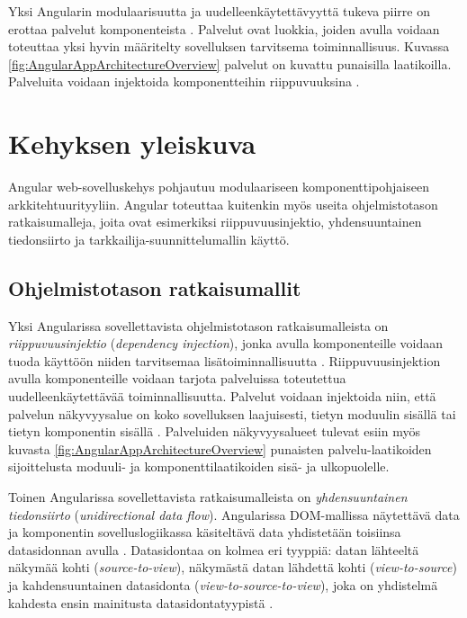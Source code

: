 \documentclass[finnish]{tktltiki2}
\theoremstyle{definition}
\theoremstyle{remark}
\numberwithin{figure}{section}
\begin{document}
Yksi Angularin modulaarisuutta ja uudelleenkäytettävyyttä tukeva piirre on erottaa palvelut komponenteista \cite{ArchitectureServices}. Palvelut ovat luokkia, joiden avulla voidaan toteuttaa yksi hyvin määritelty sovelluksen tarvitsema toiminnallisuus. Kuvassa \ref{fig:AngularAppArchitectureOverview} palvelut on kuvattu punaisilla laatikoilla. Palveluita voidaan injektoida komponentteihin riippuvuuksina \cite{ArchitectureServices}. 

\newpage


\section{Kehyksen yleiskuva}

Angular web-sovelluskehys pohjautuu modulaariseen komponenttipohjaiseen arkkitehtuurityyliin. Angular toteuttaa kuitenkin myös useita ohjelmistotason ratkaisumalleja, joita ovat esimerkiksi riippuvuusinjektio, yhdensuuntainen tiedonsiirto ja tarkkailija-suunnittelumallin käyttö.

\subsection{Ohjelmistotason ratkaisumallit}

Yksi Angularissa sovellettavista ohjelmistotason ratkaisumalleista on \textit{riippuvuusinjektio} (\textit{dependency injection}), jonka avulla komponenteille voidaan tuoda käyttöön niiden tarvitsemaa lisätoiminnallisuutta \cite{DependencyInjectionPattern}. Riippuvuusinjektion avulla komponenteille voidaan tarjota palveluissa toteutettua uudelleenkäytettävää toiminnallisuutta. Palvelut voidaan injektoida niin, että palvelun näkyvyysalue on koko sovelluksen laajuisesti, tietyn moduulin sisällä tai tietyn komponentin sisällä \cite{DependencyInjection}. Palveluiden näkyvyysalueet tulevat esiin myös kuvasta \ref{fig:AngularAppArchitectureOverview} punaisten palvelu-laatikoiden sijoittelusta moduuli- ja komponenttilaatikoiden sisä- ja ulkopuolelle.

Toinen Angularissa sovellettavista ratkaisumalleista on \textit{yhdensuuntainen tiedonsiirto} (\textit{unidirectional data flow}). Angularissa DOM-mallissa näytettävä data ja komponentin sovelluslogiikassa käsiteltävä data yhdistetään toisiinsa datasidonnan avulla \cite{TemplateSyntax}. Datasidontaa on kolmea eri tyyppiä: datan lähteeltä näkymää kohti (\textit{source-to-view}), näkymästä datan lähdettä kohti (\textit{view-to-source}) ja kahdensuuntainen datasidonta (\textit{view-to-source-to-view}), joka on yhdistelmä kahdesta ensin mainitusta datasidontatyypistä \cite{TemplateSyntax}. 
\end{document}
